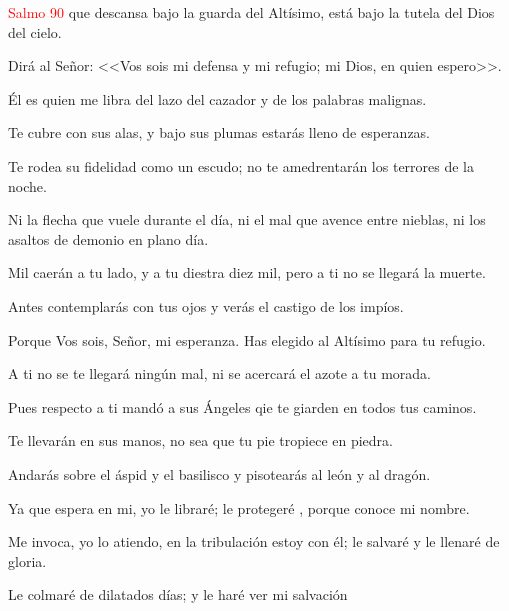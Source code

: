 \documentclass[9pt]{article}
\begin{document}
\begin{multicols}{2}
      \begin{otherlanguage}{latin}
            
      \end{otherlanguage}

      \hfill\textcolor{red}{Salmo 90}
      que descansa bajo la guarda del Altísimo, está bajo la tutela del Dios del cielo.

      Dirá al Señor: <<Vos sois mi defensa y mi refugio; mi Dios, en quien espero>>.

      Él es quien me libra del lazo del cazador y de los palabras malignas.

      Te cubre con sus alas, y bajo sus plumas estarás lleno de esperanzas.

      Te rodea su fidelidad como un escudo; no te amedrentarán los terrores de la noche.

      Ni la flecha que vuele durante el día, ni el mal que avence entre nieblas, ni los asaltos de demonio en plano día.

      Mil caerán a tu lado, y a tu diestra diez mil, pero a ti no se llegará la muerte.

      Antes contemplarás con tus ojos y verás el castigo de los impíos.

      Porque Vos sois, Señor, mi esperanza. Has elegido al Altísimo para tu refugio.

      A ti no se te llegará ningún mal, ni se acercará el azote a tu morada.

      Pues respecto a ti mandó a sus Ángeles qie te giarden en todos tus caminos.

      Te llevarán en sus manos, no sea que tu pie tropiece en piedra.

      Andarás sobre el áspid y el basilisco y pisotearás al león y al dragón.

      Ya que espera en mi, yo le libraré; le protegeré , porque conoce mi nombre.

      Me invoca, yo lo atiendo, en la tribulación estoy con él; le salvaré y le llenaré de gloria.

      Le colmaré de dilatados días; y le haré ver mi salvación


\end{multicols}
\end{document}
